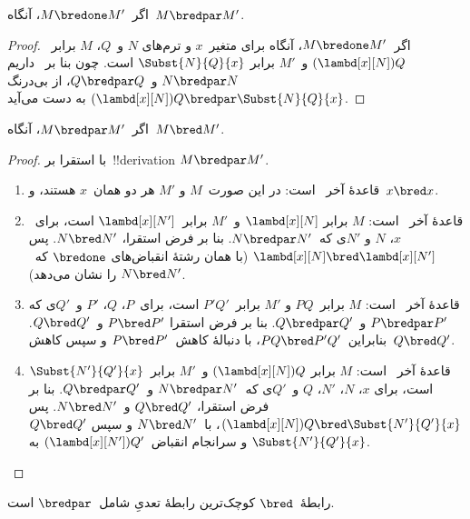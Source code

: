 \documentclass[../../../include/open-logic-section]{subfiles}
\begin{document}


\begin{lem}
  اگر~$M \bredone M'$، آنگاه~$M \bredpar M'$.
\end{lem}
\begin{proof} اگر~$M \bredone M'$، آنگاه برای متغیر~$x$ و ترم‌های
    $N$ و~$Q$، $M$ برابر~$(\lambd[x][N])Q$ و~$M'$ برابر
    $\Subst{N}{Q}{x}$ است. چون بنا بر~ داریم
    $N \bredpar N$ و~$Q \bredpar Q$، از
     بی‌درنگ
    $(\lambd[x][N])Q \bredpar \Subst{N}{Q}{x}$ به دست می‌آید.
\end{proof}

\begin{lem}
  اگر~$M \bredpar M'$، آنگاه~$M \bred M'$.
\end{lem}

\begin{proof} با استقرا بر~!!{derivation}ِ $M \bredpar M'$.
  \begin{enumerate}
  \item قاعدهٔ آخر~ است: در این صورت~$M$ و
    $M'$ هر دو همان~$x$ هستند، و~$x \bred x$.
  \item قاعدهٔ آخر~ است: $M$ برابر
    $\lambd[x][N]$ و~$M'$ برابر~$\lambd[x][N']$ است، برای~$x$، $N$ و
    $N'$ی که~$N \bredpar N'$. بنا بر فرض استقرا، $N \bred N'$. پس
    $\lambd[x][N] \bred \lambd[x][N']$ (با همان رشتهٔ انقباض‌های
    $\bredone$ که~$N \bred N'$ را نشان می‌دهد).
  \item قاعدهٔ آخر~ است: $M$ برابر~$PQ$ و
    $M'$ برابر~$P'Q'$ است، برای~$P$، $Q$، $P'$ و~$Q'$ی که
    $P \bredpar P'$ و~$Q \bredpar Q'$. بنا بر فرض استقرا
    $P \bred P'$ و~$Q \bred Q'$. بنابراین~$PQ \bred P'Q'$، با دنبالهٔ
    کاهش~$P \bred P'$ و سپس کاهش~$Q \bred Q'$.
  \item قاعدهٔ آخر~ است: $M$ برابر
    $(\lambd[x][N])Q$ و~$M'$ برابر~$\Subst{N'}{Q'}{x}$ است، برای
    $x$، $N$، $N'$، $Q$ و~$Q'$ی که~$N \bredpar N'$ و~$Q \bredpar Q'$.
    بنا بر فرض استقرا، $Q \bred Q'$ و~$N \bred N'$. پس
    $(\lambd[x][N])Q \bred \Subst{N'}{Q'}{x}$، با~$N \bred N'$ و سپس
    $Q \bred Q'$ و سرانجام انقباض~$(\lambd[x][N'])Q'$ به
    $\Subst{N'}{Q'}{x}$.
  \end{enumerate}
\end{proof}

\begin{lem}
  رابطهٔ~$\bred$ کوچک‌ترین رابطهٔ تعدیِ شامل~$\bredpar$ است.
\end{lem}
\end{document}
